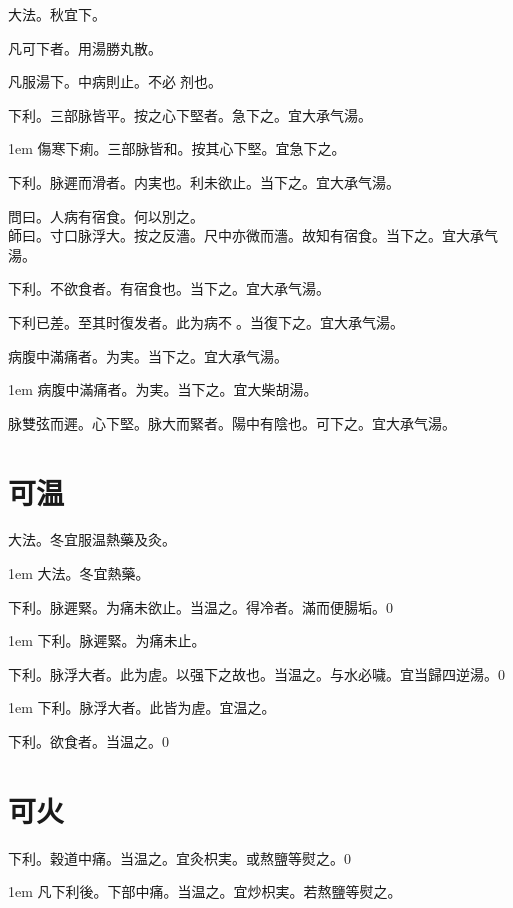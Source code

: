 大法。秋宜下。

凡可下者。用湯勝丸散。

凡服湯下。中病則止。不必{\sungtpii 𥁞}剂也。

下利。三部脉皆平。按之心下堅者。急下之。宜{\khaaitp 大}承气湯。

\hangindent 1em
傷寒下痢。三部脉皆和。按其心下堅。宜急下之。{\gaoben}

下利。脉遲而滑者。{\khaaitp 内}実也。利未欲止。当下之。宜{\khaaitp 大}承气湯。

問曰。人病有宿食。何以別之。\\
師曰。寸口脉浮大。按之反濇。尺中亦微而濇。故知有宿食。当下之。宜{\khaaitp 大}承气湯。

下利。不欲食者。有宿食也。当下之。宜{\khaaitp 大}承气湯。

下利{\khaaitp 已}差。至其时復发者。此为病不{\sungtpii 𥁞}。当復下之。宜{\khaaitp 大}承气湯。

病腹中滿痛者。为実。当下之。宜大承气湯。

\hangindent 1em
病腹中滿痛者。为実。当下之。宜大柴胡湯。

脉雙弦而遲。心下堅。脉大而緊者。陽中有陰也。可下之。宜{\khaaitp 大}承气湯。

\section{可温}

大法。冬宜服温熱藥及灸。

\hangindent 1em
大法。冬宜熱藥。{\gaoben}

下利。脉遲緊。为痛未欲止。当温之。得冷者。滿而便腸垢。0

\hangindent 1em
下利。脉遲緊。为痛未止。{\gaoben}

下利。脉浮大者。此为虗。以强下之故也。当温之。与水必噦。{\khaaitp 宜当歸四逆湯。}0

\hangindent 1em
下利。脉浮大者。此皆为虗。宜温之。{\gaoben}

下利。欲食者。当温之。0

\section{可火}

下利。穀道中痛。当温之。宜灸枳実。或熬鹽等熨之。0

\hangindent 1em
凡下利後。下部中痛。当温之。宜炒枳実。若熬鹽等熨之。{\gaoben}

